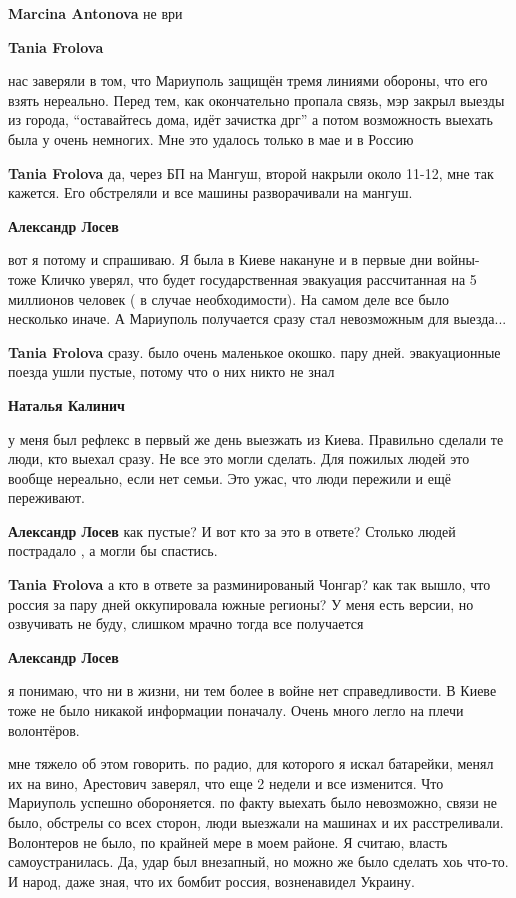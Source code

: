\begin{itemize}
\begin{itemize}
\textbf{Marcina Antonova} не ври

\textbf{Tania Frolova} 

нас заверяли в том, что Мариуполь защищён тремя линиями обороны, что его взять
нереально. Перед тем, как окончательно пропала связь, мэр закрыл выезды из
города, \enquote{оставайтесь дома, идёт зачистка дрг} а потом возможность выехать была
у очень немногих. Мне это удалось только в мае и в Россию

\textbf{Tania Frolova} да, через БП на Мангуш, второй накрыли около 11-12, мне так кажется. Его обстреляли и все машины разворачивали на мангуш.

\textbf{Александр Лосев} 

вот я потому и спрашиваю. Я была в Киеве накануне и в первые дни войны- тоже
Кличко уверял, что будет государственная эвакуация рассчитанная на 5 миллионов
человек ( в случае необходимости). На самом деле все было несколько иначе. А
Мариуполь получается сразу стал невозможным для выезда...

\textbf{Tania Frolova} сразу. было очень маленькое окошко. пару дней. эвакуационные поезда ушли пустые, потому что о них никто не знал

\textbf{Наталья Калинич} 

у меня был рефлекс в первый же день выезжать из Киева. Правильно сделали те
люди, кто выехал сразу. Не все это могли сделать. Для пожилых людей это вообще
нереально, если нет семьи. Это ужас, что люди пережили и ещё переживают.

\textbf{Александр Лосев} как пустые? И вот кто за это в ответе? Столько людей пострадало , а могли бы спастись.

\textbf{Tania Frolova} а кто в ответе за разминированый Чонгар? как так вышло, что россия за пару дней оккупировала южные регионы? У меня есть версии, но озвучивать не буду, слишком мрачно тогда все получается

\textbf{Александр Лосев} 

я понимаю, что ни в жизни, ни тем более в войне нет справедливости. В Киеве
тоже не было никакой информации поначалу. Очень много легло на плечи
волонтёров.


мне тяжело об этом говорить. по радио, для которого я искал батарейки, менял их
на вино, Арестович заверял, что еще 2 недели и все изменится. Что Мариуполь
успешно обороняется. по факту выехать было невозможно, связи не было, обстрелы
со всех сторон, люди выезжали на машинах и их расстреливали. Волонтеров не
было, по крайней мере в моем районе. Я считаю, власть самоустранилась. Да, удар
был внезапный, но можно же было сделать хоь что-то. И народ, даже зная, что их
бомбит россия, возненавидел Украину.


\end{itemize}
\end{itemize}
